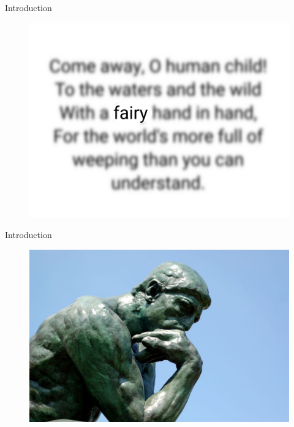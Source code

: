 \documentclass[10pt]{beamer}
\begin{document}
\begin{frame}{Introduction}
    \begin{figure}
        \centering
        \includegraphics[width=1.0\linewidth]{./img/text_focus.png}
    \end{figure}
\end{frame}

\begin{frame}{Introduction}
    \begin{figure}
        \centering
        \includegraphics[width=1.0\linewidth]{./img/thinking.jpg}
    \end{figure}
\end{frame}

\end{document}
